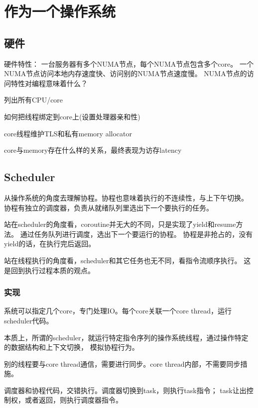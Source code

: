 \chapter{作为一个操作系统}

\section{硬件}

硬件特性： 一台服务器有多个NUMA节点，每个NUMA节点包含多个core。
一个NUMA节点访问本地内存速度快、访问别的NUMA节点速度慢。
NUMA节点的访问特性对编程意味着什么？

\begin{enumbox}
\item 列出所有CPU/core
\item 如何把线程绑定到core上(设置处理器亲和性)
\item core线程维护TLS和私有memory allocator
\item core与memory存在什么样的关系，最终表现为访存latency
\end{enumbox}

\section{Scheduler}

从操作系统的角度去理解协程。协程也意味着执行的不连续性，与上下午切换。
协程有独立的调度器，负责从就绪队列里选出下一个要执行的任务。

站在scheduler的角度看，coroutine并无大的不同，只是实现了yield和resume方法。
通过任务队列进行调度，选出下一个要运行的协程。
协程是非抢占的，没有yield的话，在执行完后返回。

站在线程执行的角度看，scheduler和其它任务也无不同，看指令流顺序执行。
这是回到执行过程本质的观点。

\subsection{实现}

系统可以指定几个core，专门处理IO。每个core关联一个core thread，运行scheduler代码。

本质上，所谓的scheduler，就运行特定指令序列的操作系统线程，通过操作特定的数据结构和上下文切换，
模拟协程行为。

别的线程要与core thread通信，需要进行同步。core thread内部，不需要同步措施。

调度器和协程代码，交错执行。调度器切换到task，则执行task指令；
task让出控制权，或者返回，则执行调度器指令。

